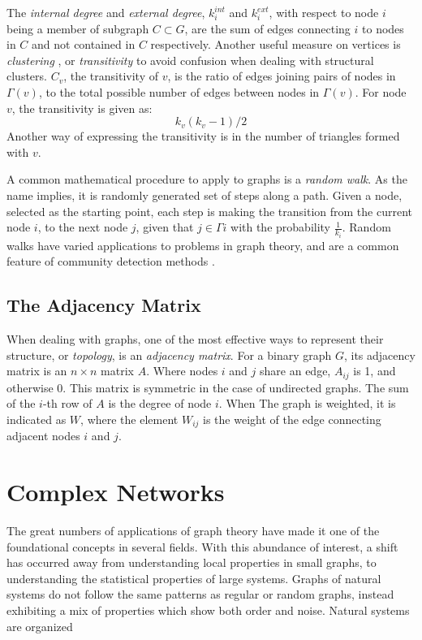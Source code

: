 The \textit{internal degree} and \textit{external degree}, $k^{int}_i$ and $k^{ext}_i$, with respect to node $i$ being a member of subgraph $C\subset G$, are the sum of edges connecting $i$ to nodes in $C$ and not contained in $C$ respectively. 
Another useful measure on vertices is \textit{clustering} \cite{Watts1998}, or \textit{transitivity} to avoid confusion when dealing with structural clusters. $C_v$, the transitivity of $v$, is the ratio of edges joining pairs of nodes in $\Gamma(v)$, to the total possible number of edges between nodes in $\Gamma(v)$. For node $v$, the transitivity is given as: $$k_v(k_v-1)/2$$ Another way of expressing the transitivity is in the number of triangles formed with $v$.

A common mathematical procedure to apply to graphs is a \textit{random walk}. As the name implies, it is  randomly generated set of steps along a path. Given a node, selected as the starting point, each step is making the transition from the current node $i$, to the next node $j$, given that $j\in\Gamma{i}$ with the probability $\frac{1}{k_i}$. Random walks have varied applications to problems in graph theory, and are a common feature of community detection methods \cite{Pons2006}.




\subsection{The Adjacency Matrix}
When dealing with graphs, one of the most effective ways to represent their structure, or \textit{topology}, is an \textit{adjacency matrix}. For a binary graph $G$, its adjacency matrix is an $n\times n$ matrix $A$. Where nodes $i$ and $j$ share an edge, $A_{ij}$ is 1, and otherwise 0. This matrix is symmetric in the case of undirected graphs. The sum of the $i$-th row of $A$ is the degree of node $i$.
When The graph is weighted, it is indicated as $W$, where the element $W_{ij}$ is the weight of the edge connecting adjacent nodes $i$ and $j$.

\section{Complex Networks}
The great numbers of applications of graph theory have made it one of the foundational concepts in several fields. With this abundance of interest, a shift has occurred away from understanding local properties in small graphs, to understanding the statistical properties of large systems. Graphs of natural systems do not follow the same patterns as regular or random graphs, instead exhibiting a mix of properties which show both order and noise. Natural systems are organized 

